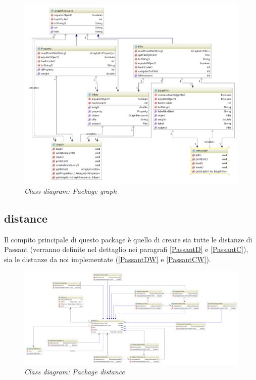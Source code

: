 \begin{figure}[H]
	\includegraphics[width=\textwidth]{./images/Diagrams/graph.png}
	\caption{\emph{Class diagram: Package graph}}
\end{figure}

\subsection{distance}
Il compito principale di questo package è quello di creare sia tutte le distanze di Passant (verranno definite nel dettaglio nei paragrafi \ref{PassantD} e \ref{PassantC}), sia le distanze da noi implementate (\ref{PassantDW} e \ref{PassantCW}).
\begin{figure}[H]
	\advance\leftskip-3cm
	\includegraphics[width=1.45\textwidth]{./images/Diagrams/distance.png}
	\caption{\emph{Class diagram: Package distance}}
\end{figure}

